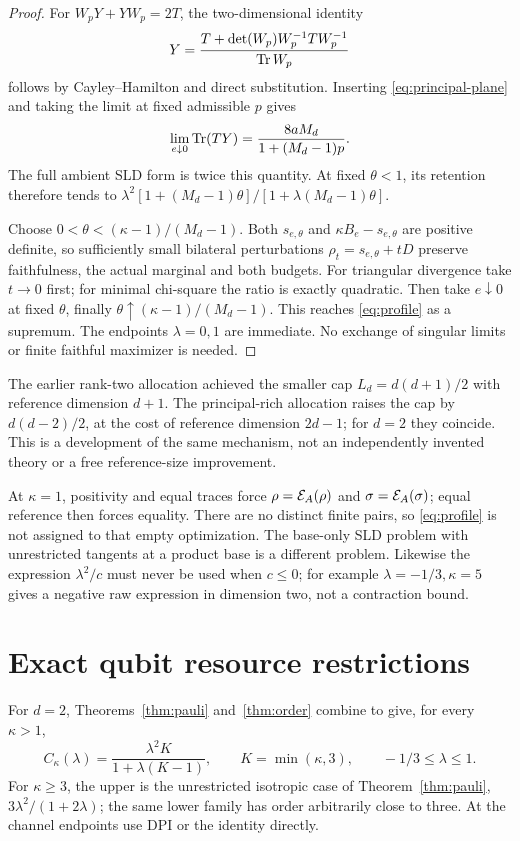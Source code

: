 \begin{proof}
For \(W_pY+YW_p=2T\), the two-dimensional identity
\[
 Y=\frac{T+\det(W_p)W_p^{-1}TW_p^{-1}}{\operatorname{Tr} W_p}
\]
follows by Cayley--Hamilton and direct substitution. Inserting \eqref{eq:principal-plane} and taking the limit at fixed admissible \(p\) gives
\begin{equation}\label{eq:general-limit}
 \lim_{e\downarrow0}\operatorname{Tr}(TY)=\frac{8aM_d}{1+(M_d-1)p}.
\end{equation}
The full ambient SLD form is twice this quantity. At fixed \(\theta<1\), its retention therefore tends to
\(\lambda^2[1+(M_d-1)\theta]/[1+\lambda(M_d-1)\theta]\).

Choose \(0<\theta<(\kappa-1)/(M_d-1)\). Both \(s_{e,\theta}\) and \(\kappa B_e-s_{e,\theta}\) are positive definite, so sufficiently small bilateral perturbations \(\rho_t=s_{e,\theta}+tD\) preserve faithfulness, the actual marginal and both budgets. For triangular divergence take \(t\to0\) first; for minimal chi-square the ratio is exactly quadratic. Then take \(e\downarrow0\) at fixed \(\theta\), finally \(\theta\uparrow(\kappa-1)/(M_d-1)\). This reaches \eqref{eq:profile} as a supremum. The endpoints \(\lambda=0,1\) are immediate. No exchange of singular limits or finite faithful maximizer is needed.
\end{proof}

The earlier rank-two allocation achieved the smaller cap \(L_d=d(d+1)/2\) with reference dimension \(d+1\). The principal-rich allocation raises the cap by \(d(d-2)/2\), at the cost of reference dimension \(2d-1\); for \(d=2\) they coincide. This is a development of the same mechanism, not an independently invented theory or a free reference-size improvement.

\begin{remark}
At \(\kappa=1\), positivity and equal traces force \(\rho=\mathcal E_A(\rho)\) and \(\sigma=\mathcal E_A(\sigma)\); equal reference then forces equality. There are no distinct finite pairs, so \eqref{eq:profile} is not assigned to that empty optimization. The base-only SLD problem with unrestricted tangents at a product base is a different problem. Likewise the expression \(\lambda^2/c\) must never be used when \(c\le0\); for example \(\lambda=-1/3,\kappa=5\) gives a negative raw expression in dimension two, not a contraction bound.
\end{remark}

\section{Exact qubit resource restrictions}\label{sec:resources}
For \(d=2\), Theorems~\ref{thm:pauli} and~\ref{thm:order} combine to give, for every \(\kappa>1\),
\[
 C_\kappa(\lambda)=\frac{\lambda^2K}{1+\lambda(K-1)},\qquad K=\min(\kappa,3),\qquad -1/3\le\lambda\le1.
\]
For \(\kappa\ge3\), the upper is the unrestricted isotropic case of Theorem~\ref{thm:pauli}, \(3\lambda^2/(1+2\lambda)\); the same lower family has order arbitrarily close to three. At the channel endpoints use DPI or the identity directly.


